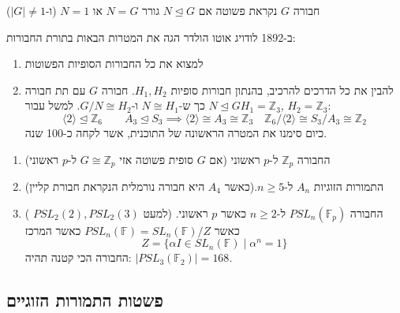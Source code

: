 \documentclass{tstextbook}
\begin{document}
\begin{definition}
חבורה \(G\) נקראת פשוטה אם \(N\trianglelefteq G\) גורר \(N=G\) או \(N=1\) (ו-\(|G|\neq 1\))

\end{definition}
\begin{definition}
ב-1892 לודויג אוטו הולדר הגה את המטרות הבאות בתורת החבורות:

  \begin{enumerate}
    \item למצוא את כל החבורות הסופיות הפשוטות 


    \item להבין את כל הדרכים להרכיב, בהנתון חבורות סופיות \(H_{1},H_{2}\). חבורה \(G\) עם תת חבורה \(N\trianglelefteq G\) כך ש-\(N\cong H_{1}\) 
 ו-\(G / N \cong H_{2}\).
 למשל עבור\(H_{1}=\mathbb{Z} _3\), \(H_{2}=\mathbb{Z} _3\):
$$\langle 2\rangle \trianglelefteq \mathbb{Z} _{6}\qquad A_{3}\trianglelefteq S_{3}\implies \langle 2\rangle \cong A_{3}\cong\mathbb{Z} _{3}\quad \mathbb{Z} _{6} / \langle 2\rangle \cong S_{3} / A_{3} \cong \mathbb{Z} _{2}$$
כיום סימנו את המטרה הראשונה של התוכנית, אשר לקחה כ-100 שנה.


  \end{enumerate}
\end{definition}
\begin{example}
  \begin{enumerate}
    \item החבורה \(\mathbb{Z} _{p}\) ל-\(p\) ראשוני (אם \(G\) סופית פשוטה אזי \(G\cong\mathbb{Z} _p\) ל-\(p\) ראשוני) 


    \item התמורות הזוגיות \(A_{n}\) ל-\(n\geq 5\).(כאשר \(A_{4}\) היא חבורה נורמלית הנקראת חבורת קליין) 


    \item החבורה \(PSL_{n}\left( \mathbb{F}_{p} \right)\) ל-\(n\geq 2\) כאשר \(p\) ראשוני. (למעט \(PSL_{2}(2),PSL_{2}(3)\) ) כאשר \(PSL_{n}\left( \mathbb{F} \right)=SL_{n}\left( \mathbb{F} \right)/Z\) כאשר המרכז 
 $$Z=\{ \alpha I\in SL_{n}\left( \mathbb{F} \right)\mid \alpha^n=1 \}$$
 החבורה הכי קטנה תהיה: \(|PSL_{3}\left( \mathbb{F}_{2} \right)|=168\).


  \end{enumerate}
\end{example}
\subsection{פשטות התמורות הזוגיים}
\end{document}

